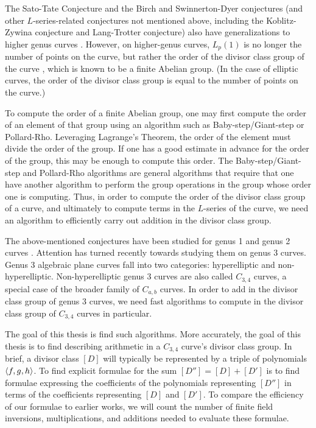 The Sato-Tate Conjecture and the Birch and Swinnerton-Dyer conjectures
(and other $L$-series-related conjectures not mentioned above,
including the Koblitz-Zywina conjecture and Lang-Trotter conjecture)
also have generalizations to higher genus curves \cite{sutherland16} \cite{sutherland18}.
However, on higher-genus curves, $L_p(1)$ is no longer the number of points on the curve,
but rather the order of the divisor class group of the curve \cite{kedlaya08},
which is known to be a finite Abelian group.
(In the case of elliptic curves, the order of the divisor class group is
equal to the number of points on the curve.)

To compute the order of a finite Abelian group, one may first compute the order of an element of that group
using an algorithm such as Baby-step/Giant-step or Pollard-Rho.
Leveraging Lagrange's Theorem, the order of the element must divide the order of the group.
If one has a good estimate in advance for the order of the group, this may be enough
to compute this order.
The Baby-step/Giant-step and Pollard-Rho algorithms are general algorithms that
require that one have another algorithm to perform the group operations in the group
whose order one is computing.
Thus, in order to compute the order of the divisor class group of a curve,
and ultimately to compute terms in the $L$-series of the curve,
we need an algorithm to efficiently carry out addition in the divisor class group.

The above-mentioned conjectures have been studied for genus 1 and genus 2 curves \cite{kedlaya08}.
Attention has turned recently towards studying them on genus 3 curves.
Genus 3 algebraic plane curves fall into two categories: hyperelliptic and non-hyperelliptic.
Non-hyperelliptic genus 3 curves are also called $C_{3,4}$ curves, a special case of the broader family of $C_{a,b}$ curves.
In order to add in the divisor class group of genus 3 curves,
we need fast algorithms to compute in the divisor class group of $C_{3,4}$ curves in particular.

The goal of this thesis is find such algorithms.
More accurately, the goal of this thesis is to find  describing arithmetic in a $C_{3,4}$ curve's divisor class group.
In brief, a divisor class $[D]$ will typically be represented by a triple of polynomials $\left\langle f,g,h \right\rangle$.
To find explicit formulae for the sum $[D''] = [D] + [D']$ is to find formulae expressing the coefficients of the
polynomials representing $[D'']$ in terms of the coefficients representing $[D]$ and $[D']$.
To compare the efficiency of our formulae to earlier works,
we will count the number of finite field inversions, multiplications, and additions needed to evaluate these formulae.



